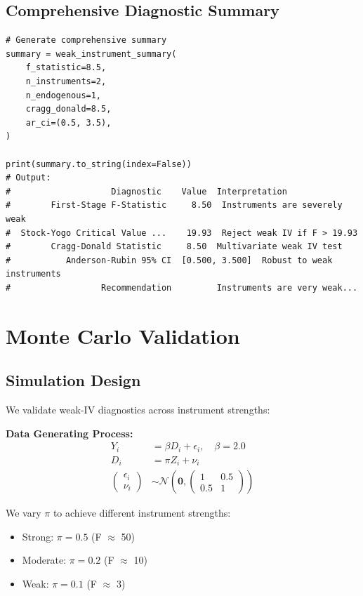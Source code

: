 \subsection{Comprehensive Diagnostic Summary}

\begin{verbatim}
# Generate comprehensive summary
summary = weak_instrument_summary(
    f_statistic=8.5,
    n_instruments=2,
    n_endogenous=1,
    cragg_donald=8.5,
    ar_ci=(0.5, 3.5),
)

print(summary.to_string(index=False))
# Output:
#                    Diagnostic    Value  Interpretation
#        First-Stage F-Statistic     8.50  Instruments are severely weak
#  Stock-Yogo Critical Value ...    19.93  Reject weak IV if F > 19.93
#        Cragg-Donald Statistic     8.50  Multivariate weak IV test
#           Anderson-Rubin 95% CI  [0.500, 3.500]  Robust to weak instruments
#                  Recommendation         Instruments are very weak...
\end{verbatim}


\section{Monte Carlo Validation}
\label{sec:weak_validation}

\subsection{Simulation Design}

We validate weak-IV diagnostics across instrument strengths:

\textbf{Data Generating Process:}
\begin{align*}
Y_i &= \beta D_i + \epsilon_i, \quad \beta = 2.0 \\
D_i &= \pi Z_i + \nu_i \\
\begin{pmatrix} \epsilon_i \\ \nu_i \end{pmatrix} &\sim \mathcal{N}\left(\mathbf{0}, \begin{pmatrix} 1 & 0.5 \\ 0.5 & 1 \end{pmatrix}\right)
\end{align*}

We vary $\pi$ to achieve different instrument strengths:
\begin{itemize}
    \item Strong: $\pi = 0.5$ (F $\approx$ 50)
    \item Moderate: $\pi = 0.2$ (F $\approx$ 10)
    \item Weak: $\pi = 0.1$ (F $\approx$ 3)
\end{itemize}

